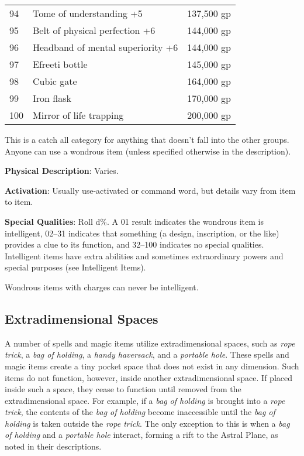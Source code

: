 \begin{table}[]
\begin{tabular}{lll}
94  & Tome of understanding +5                       & 137,500 gp   \\
95  & Belt of physical perfection +6                 & 144,000 gp   \\
96  & Headband of mental superiority +6              & 144,000 gp   \\
97  & Efreeti bottle                                 & 145,000 gp   \\
98  & Cubic gate                                     & 164,000 gp   \\
99  & Iron flask                                     & 170,000 gp   \\
100 & Mirror of life trapping                        & 200,000 gp  
\end{tabular}
\end{table}

\label{f0}				
This is a catch all category for anything that doesn't fall into the other groups. Anyone can use a wondrous item (unless specified otherwise in the description).
				
\textbf{Physical Description}: Varies.
				
\textbf{Activation}: Usually use-activated or command word, but details vary from item to item.
				
\textbf{Special Qualities}: Roll d\%. A 01 result indicates the wondrous item is intelligent, 02--31 indicates that something (a design, inscription, or the like) provides a clue to its function, and 32--100 indicates no special qualities. Intelligent items have extra abilities and sometimes extraordinary powers and special purposes (see Intelligent Items).
				
Wondrous items with charges can never be intelligent.
				
\subsection{Extradimensional Spaces}

			
A number of spells and magic items utilize extradimensional spaces, such as \textit{rope trick}, a \textit{bag of holding}, a \textit{handy haversack}, and a \textit{portable hole}. These spells and magic items create a tiny pocket space that does not exist in any dimension. Such items do not function, however, inside another extradimensional space. If placed inside such a space, they cease to function until removed from the extradimensional space. For example, if a \textit{bag of holding} is brought into a\textit{ rope trick}, the contents of the \textit{bag of holding} become inaccessible until the \textit{bag of holding} is taken outside the \textit{rope trick}. The only exception to this is when a\textit{ bag of holding} and a \textit{portable hole} interact, forming a rift to the Astral Plane, as noted in their descriptions.
				
